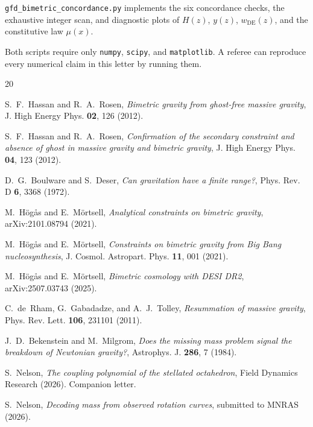 \documentclass[twocolumn,showpacs,preprintnumbers,amsmath,amssymb,prd]{revtex4-2}
\begin{document}
\texttt{gfd\_bimetric\_concordance.py} implements the six concordance checks, the exhaustive integer scan, and diagnostic plots of $H(z)$, $y(z)$, $w_\mathrm{DE}(z)$, and the constitutive law $\mu(x)$.

Both scripts require only \texttt{numpy}, \texttt{scipy}, and \texttt{matplotlib}. A referee can reproduce every numerical claim in this letter by running them.

\begin{thebibliography}{20}

S.~F.~Hassan and R.~A.~Rosen,
\textit{Bimetric gravity from ghost-free massive gravity},
J. High Energy Phys. \textbf{02}, 126 (2012).

S.~F.~Hassan and R.~A.~Rosen,
\textit{Confirmation of the secondary constraint and absence of ghost in massive gravity and bimetric gravity},
J. High Energy Phys. \textbf{04}, 123 (2012).

D.~G.~Boulware and S.~Deser,
\textit{Can gravitation have a finite range?},
Phys. Rev. D \textbf{6}, 3368 (1972).

M.~H\"og\aa s and E.~M\"ortsell,
\textit{Analytical constraints on bimetric gravity},
arXiv:2101.08794 (2021).

M.~H\"og\aa s and E.~M\"ortsell,
\textit{Constraints on bimetric gravity from Big Bang nucleosynthesis},
J. Cosmol. Astropart. Phys. \textbf{11}, 001 (2021).

M.~H\"og\aa s and E.~M\"ortsell,
\textit{Bimetric cosmology with DESI DR2},
arXiv:2507.03743 (2025).

C.~de~Rham, G.~Gabadadze, and A.~J.~Tolley,
\textit{Resummation of massive gravity},
Phys. Rev. Lett. \textbf{106}, 231101 (2011).

J.~D.~Bekenstein and M.~Milgrom,
\textit{Does the missing mass problem signal the breakdown of Newtonian gravity?},
Astrophys. J. \textbf{286}, 7 (1984).

S.~Nelson,
\textit{The coupling polynomial of the stellated octahedron},
Field Dynamics Research (2026). Companion letter.

S.~Nelson,
\textit{Decoding mass from observed rotation curves},
submitted to MNRAS (2026).

\end{thebibliography}
\end{document}
